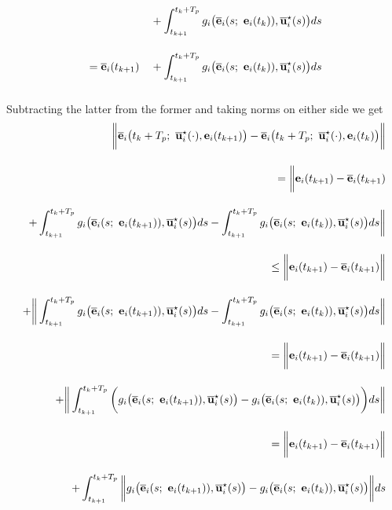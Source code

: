 \begin{gg_box}
\begin{alignat}{2}
    &                      &&+ \int_{t_{k+1}}^{t_k + T_p} g_i\big(\overline{\vect{e}}_i(s;\ \vect{e}_i(t_k)), \overline{\vect{u}}_i^{\star}(s) \big)ds \\[2.5ex]
    &= \overline{\vect{e}}_i(t_{k+1}) &&+ \int_{t_{k+1}}^{t_k + T_p} g_i\big(\overline{\vect{e}}_i(s;\ \vect{e}_i(t_k)), \overline{\vect{u}}_i^{\star}(s) \big)ds \\[2.5ex]
\end{alignat}
Subtracting the latter from the former and taking norms on either side we get
\begin{alignat}{2}
  \bigg \|\overline{\vect{e}}_i\big(t_k + T_p;\ \overline{\vect{u}}_i^{\star}(\cdot), \vect{e}_i(t_{k+1})\big)
    - \overline{\vect{e}}_i\big(t_k + T_p;\ \overline{\vect{u}}_i^{\star}(\cdot), \vect{e}_i(t_k)\big) \bigg\| \\[2.5ex]
  = \bigg \| \vect{e}_i(t_{k+1}) - \overline{\vect{e}}_i(t_{k+1}) \\[2.5ex]
  + \int_{t_{k+1}}^{t_k + T_p} g_i\big(\overline{\vect{e}}_i(s;\ \vect{e}_i(t_{k+1})), \overline{\vect{u}}_i^{\star}(s) \big)ds
    - \int_{t_{k+1}}^{t_k + T_p} g_i\big(\overline{\vect{e}}_i(s;\ \vect{e}_i(t_k)), \overline{\vect{u}}_i^{\star}(s) \big)ds \bigg \| \\[2.5ex]
  \leq \bigg \| \vect{e}_i(t_{k+1}) - \overline{\vect{e}}_i(t_{k+1}) \bigg\| \\[2.5ex]
  + \bigg \| \int_{t_{k+1}}^{t_k + T_p} g_i\big(\overline{\vect{e}}_i(s;\ \vect{e}_i(t_{k+1})), \overline{\vect{u}}_i^{\star}(s) \big)ds
    - \int_{t_{k+1}}^{t_k + T_p} g_i\big(\overline{\vect{e}}_i(s;\ \vect{e}_i(t_k)), \overline{\vect{u}}_i^{\star}(s) \big)ds \bigg \| \\[2.5ex]
  = \bigg \| \vect{e}_i(t_{k+1}) - \overline{\vect{e}}_i(t_{k+1}) \bigg\| \\[2.5ex]
  + \bigg \| \int_{t_{k+1}}^{t_k + T_p} \bigg( g_i\big(\overline{\vect{e}}_i(s;\ \vect{e}_i(t_{k+1})), \overline{\vect{u}}_i^{\star}(s) \big)
  -  g_i\big(\overline{\vect{e}}_i(s;\ \vect{e}_i(t_k)), \overline{\vect{u}}_i^{\star}(s) \big) \bigg) ds \bigg \| \\[2.5ex]
  = \bigg \| \vect{e}_i(t_{k+1}) - \overline{\vect{e}}_i(t_{k+1}) \bigg\| \\[2.5ex]
  +  \int_{t_{k+1}}^{t_k + T_p} \bigg\| g_i\big(\overline{\vect{e}}_i(s;\ \vect{e}_i(t_{k+1})), \overline{\vect{u}}_i^{\star}(s) \big)
  -  g_i\big(\overline{\vect{e}}_i(s;\ \vect{e}_i(t_k)), \overline{\vect{u}}_i^{\star}(s) \big) \bigg\| ds \\[2.5ex]

\end{alignat}
\end{gg_box}

